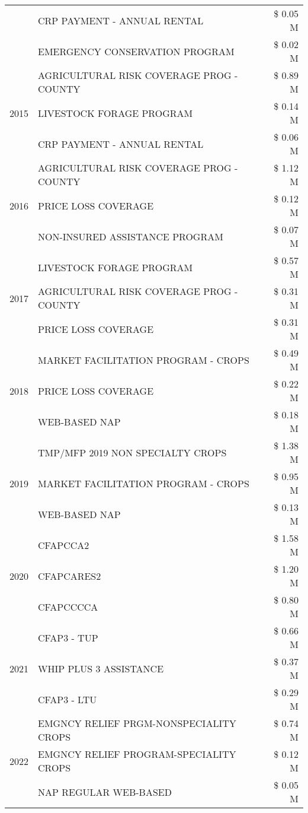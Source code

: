 \begin{tabular}{llr}
 & CRP PAYMENT - ANNUAL RENTAL & \$ 0.05 M \\
 & EMERGENCY CONSERVATION PROGRAM & \$ 0.02 M \\
\cline{1-3}
\multirow[t]{3}{*}{2015} & AGRICULTURAL RISK COVERAGE PROG - COUNTY & \$ 0.89 M \\
 & LIVESTOCK FORAGE PROGRAM & \$ 0.14 M \\
 & CRP PAYMENT - ANNUAL RENTAL & \$ 0.06 M \\
\cline{1-3}
\multirow[t]{3}{*}{2016} & AGRICULTURAL RISK COVERAGE PROG - COUNTY & \$ 1.12 M \\
 & PRICE LOSS COVERAGE & \$ 0.12 M \\
 & NON-INSURED ASSISTANCE PROGRAM & \$ 0.07 M \\
\cline{1-3}
\multirow[t]{3}{*}{2017} & LIVESTOCK FORAGE PROGRAM & \$ 0.57 M \\
 & AGRICULTURAL RISK COVERAGE PROG - COUNTY & \$ 0.31 M \\
 & PRICE LOSS COVERAGE & \$ 0.31 M \\
\cline{1-3}
\multirow[t]{3}{*}{2018} & MARKET FACILITATION PROGRAM - CROPS & \$ 0.49 M \\
 & PRICE LOSS COVERAGE & \$ 0.22 M \\
 & WEB-BASED NAP & \$ 0.18 M \\
\cline{1-3}
\multirow[t]{3}{*}{2019} & TMP/MFP 2019 NON SPECIALTY CROPS & \$ 1.38 M \\
 & MARKET FACILITATION PROGRAM - CROPS & \$ 0.95 M \\
 & WEB-BASED NAP & \$ 0.13 M \\
\cline{1-3}
\multirow[t]{3}{*}{2020} & CFAPCCA2 & \$ 1.58 M \\
 & CFAPCARES2 & \$ 1.20 M \\
 & CFAPCCCCA & \$ 0.80 M \\
\cline{1-3}
\multirow[t]{3}{*}{2021} & CFAP3 - TUP & \$ 0.66 M \\
 & WHIP PLUS 3 ASSISTANCE & \$ 0.37 M \\
 & CFAP3 - LTU & \$ 0.29 M \\
\cline{1-3}
\multirow[t]{3}{*}{2022} & EMGNCY RELIEF PRGM-NONSPECIALITY CROPS & \$ 0.74 M \\
 & EMGNCY RELIEF PROGRAM-SPECIALITY CROPS & \$ 0.12 M \\
 & NAP REGULAR WEB-BASED & \$ 0.05 M \\
\cline{1-3}
\bottomrule
\end{tabular}
